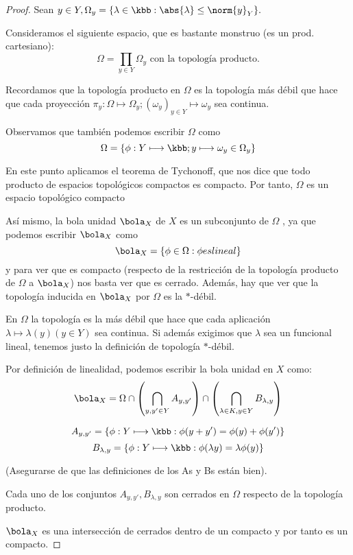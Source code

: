 \documentclass[palatino]{apuntes}
\begin{document}
\begin{proof} Sean $y \in Y, \Omega_y = \{ \lambda \in \kbb : \abs{\lambda} \leq \norm{y}_Y \}. $

Consideramos el siguiente espacio, que es bastante monstruo (es un prod. cartesiano): \[ \Omega =  \prod_{y \in Y} \Omega_y \text{ con la topología producto.} \]

Recordamos que la topología producto en $\Omega$ es la topología más débil que hace que cada proyección $ \pi_y : \Omega \longmapsto \Omega_y ; (\omega_y)_{y \in Y} \longmapsto \omega_y $ sea continua.

Observamos que también podemos escribir $\Omega$ como \[ \Omega = \{ \phi : Y \longmapsto \kbb ; y \longmapsto \omega_y \in \Omega_y  \} \]

En este punto aplicamos el teorema de Tychonoff, que nos dice que todo producto de espacios topológicos compactos es compacto. Por tanto, $\Omega$ es un espacio topológico compacto

Así mismo, la bola unidad $\bola_X$ de $X$ es un subconjunto de $\Omega$ , ya que podemos escribir $\bola_X$ como \[ \bola_X = \{ \phi \in \Omega : \phi es lineal \} \] y para ver que es compacto (respecto de la restricción de la topología producto de $\Omega$ a $\bola_X$) nos basta ver que es cerrado. Además, hay que ver que la topología inducida en $\bola_X$ por $\Omega$ es la $*$-débil.

En $\Omega$ la topología es la más débil que hace que cada aplicación $\lambda \longmapsto \lambda(y) (y \in Y)$ sea continua. Si además exigimos que $\lambda$ sea un funcional lineal, tenemos justo la definición de topología $*$-débil.

Por definición de linealidad, podemos escribir la bola unidad en $X$ como: \[ \bola_X = \Omega \cap \left( \bigcap_{y, y' \in Y} A_{y, y'} \right) \cap \left( \bigcap_{\lambda \in K, y \in Y} B_{\lambda, y} \right) \]

\[ A_{y, y'} = \{ \phi : Y \longmapsto \kbb : \phi(y + y') = \phi(y) + \phi(y') \} \]
\[ B_{\lambda, y} = \{ \phi : Y \longmapsto \kbb : \phi(\lambda y) = \lambda \phi(y) \} \]

(Asegurarse de que las definiciones de los As y Bs están bien).

Cada uno de los conjuntos $A_{y, y'}, B_{\lambda, y}$ son cerrados en $\Omega$ respecto de la topología producto.

$\bola_X$ es una intersección de cerrados dentro de un compacto y por tanto es un compacto.

\end{proof}
\end{document}
